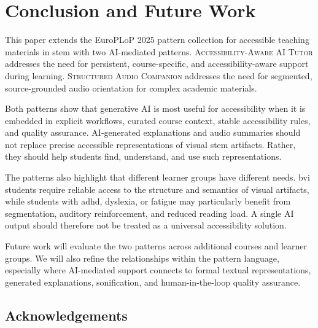 \section{Conclusion and Future Work}

This paper extends the EuroPLoP 2025 pattern collection for accessible teaching materials in \ac{stem} with two AI-mediated patterns. \textsc{Accessibility-Aware AI Tutor} addresses the need for persistent, course-specific, and accessibility-aware support during learning. \textsc{Structured Audio Companion} addresses the need for segmented, source-grounded audio orientation for complex academic materials.

Both patterns show that generative AI is most useful for accessibility when it is embedded in explicit workflows, curated course context, stable accessibility rules, and quality assurance. AI-generated explanations and audio summaries should not replace precise accessible representations of visual \ac{stem} artifacts. Rather, they should help students find, understand, and use such representations.

The patterns also highlight that different learner groups have different needs. \ac{bvi} students require reliable access to the structure and semantics of visual artifacts, while students with \ac{adhd}, dyslexia, or fatigue may particularly benefit from segmentation, auditory reinforcement, and reduced reading load. A single AI output should therefore not be treated as a universal accessibility solution.

Future work will evaluate the two patterns across additional courses and learner groups. We will also refine the relationships within the pattern language, especially where AI-mediated support connects to formal textual representations, generated explanations, sonification, and human-in-the-loop quality assurance.

\subsection*{Acknowledgements} 

